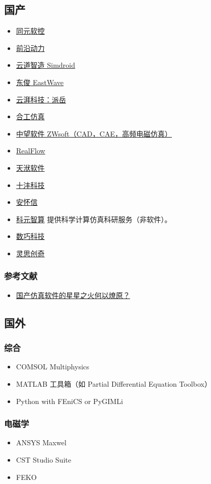 

\begin{issues}
\issueDraft
\end{issues}

\subsection{国产}
\begin{itemize}
\item \href{https://www.tongyuan.cc/}{同元软控}
\item \href{http://www.adicn.com/}{前沿动力}
\item \href{https://www.ibe.cn/}{云道智造 Simdroid}
\item \href{https://www.eastfdtd.com/index.aspx}{东俊 EastWave}
\item \href{https://www.yunpaikeji.com.cn/cpfw}{云湃科技：派岳}
\item \href{http://www.uninsim.com/}{合工仿真}
\item \href{https://www.zwsoft.cn/product/cae/waves}{中望软件 ZWsoft（CAD，CAE，高频电磁仿真）}
\item \href{https://www.realflow.com.cn/}{RealFlow}
\item \href{https://www.njtf.cn/}{天洑软件}
\item \href{https://www.tenfong.cn/}{十沣科技}
\item \href{http://www.anwiseglobal.cn/}{安怀信}
\item \href{https://www.keyuanzhisuan.com/}{科元智算} 提供科学计算仿真科研服务（非软件）。
\item \href{https://www.simright.com/zh/}{数巧科技}
\item \href{http://www.linkstech.com.cn/}{灵思创奇}
\end{itemize}

\subsubsection{参考文献}
\begin{itemize}
\item \href{https://m.e-works.net.cn/articles/article151824.htm}{国产仿真软件的星星之火何以燎原？}
\end{itemize}

\subsection{国外}

\subsubsection{综合}
\begin{itemize}
\item COMSOL Multiphysics
\item MATLAB 工具箱（如 Partial Differential Equation Toolbox）
\item Python with FEniCS or PyGIMLi
\end{itemize}

\subsubsection{电磁学}
\begin{itemize}
\item ANSYS Maxwel
\item CST Studio Suite
\item FEKO
\end{itemize}
